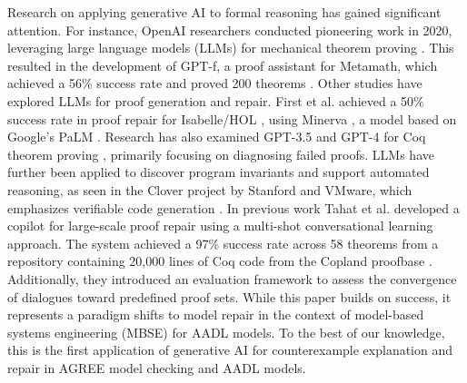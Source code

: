 Research on applying generative AI to formal reasoning has gained significant attention. For instance, OpenAI researchers conducted pioneering work in 2020, leveraging large language models (LLMs) for mechanical theorem proving \cite{polu2020generative}. This resulted in the development of GPT-f, a proof assistant for Metamath, which achieved a 56\% success rate and proved 200 theorems \cite{megill2019metamath}. Other studies have explored LLMs for proof generation and repair. First et al. achieved a 50\% success rate in proof repair for Isabelle/HOL \cite{first2023baldur}, using Minerva \cite{lewkowycz2022solving}, a model based on Google’s PaLM \cite{chowdhery2022palm}. Research has also examined GPT-3.5 and GPT-4 for Coq theorem proving \cite{zhang2023getting}, primarily focusing on diagnosing failed proofs. LLMs have further been applied to discover program invariants \cite{pei2023can, wu2023lemur} and support automated reasoning, as seen in the Clover project by Stanford and VMware, which emphasizes verifiable code generation \cite{sun2024clover}.
%
In previous work \cite{CoqDog} \cite{CoqDogHCSS24} Tahat et al. developed a copilot for large-scale proof repair using a multi-shot conversational learning approach. The system achieved a 97\% success rate across 58 theorems from a repository containing 20,000 lines of Coq code from the Copland proofbase \cite{CoqDog}. Additionally, they introduced an evaluation framework to assess the convergence of dialogues toward predefined proof sets.
%
While this paper builds on \cite{CoqDog}
success, it represents a paradigm shifts to model repair in the context of model-based systems engineering (MBSE) for AADL models. %
To the best of our knowledge, this is the first application of generative AI for counterexample explanation and repair in AGREE model checking and AADL models.
